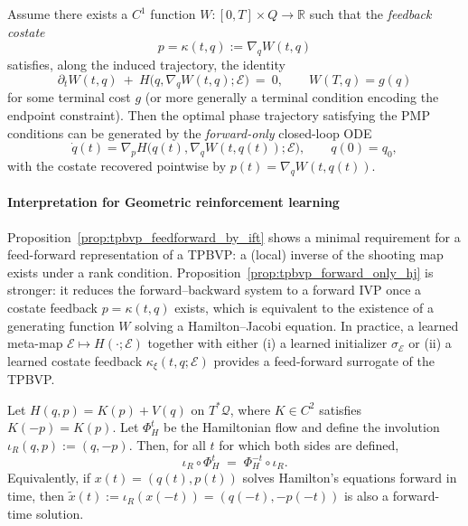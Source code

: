 \begin{proposition}
\label{prop:tpbvp_forward_only_hj}
Assume there exists a $C^1$ function $W:[0,T]\times Q\to\mathbb R$ such that the \emph{feedback costate}
\[
p=\kappa(t,q):=\nabla_q W(t,q)
\]
satisfies, along the induced trajectory, the identity
\begin{equation}
\label{eq:hj_identity}
\partial_t W(t,q)\ +\ H\big(q,\nabla_q W(t,q);\mathcal E\big)\ =\ 0,
\qquad
W(T,q)=g(q)
\end{equation}
for some terminal cost $g$ (or more generally a terminal condition encoding the endpoint constraint).
Then the optimal phase trajectory satisfying the PMP conditions can be generated by the \emph{forward-only} closed-loop ODE
\[
\dot q(t)=\nabla_p H\big(q(t),\nabla_q W(t,q(t));\mathcal E\big),\qquad q(0)=q_0,
\]
with the costate recovered pointwise by $p(t)=\nabla_q W(t,q(t))$.
\end{proposition}

\paragraph{ Interpretation for Geometric reinforcement learning}
Proposition~\ref{prop:tpbvp_feedforward_by_ift} shows a minimal requirement for a feed-forward representation of a TPBVP:
a (local) inverse of the shooting map exists under a rank condition.
Proposition~\ref{prop:tpbvp_forward_only_hj} is stronger: it reduces the forward--backward system to a forward IVP once a costate
feedback $p=\kappa(t,q)$ exists, which is equivalent to the existence of a generating function $W$ solving a Hamilton--Jacobi equation.
In practice, a learned meta-map $\mathcal E\mapsto H(\cdot;\mathcal E)$ together with either (i) a learned initializer
$\sigma_{\mathcal E}$ or (ii) a learned costate feedback $\kappa_\xi(t,q;\mathcal E)$ provides a feed-forward surrogate of the TPBVP.

\begin{lemma}
\label{lem:mech_time_reversal}
Let $H(q,p)=K(p)+V(q)$ on $T^{*}\mathcal{Q}$, where $K\in C^2$ satisfies $K(-p)=K(p)$. Let $\Phi_H^t$ be the Hamiltonian flow and define the involution $\iota_R(q,p):=(q,-p)$.
Then, for all $t$ for which both sides are defined,
\[
\iota_R\circ \Phi_H^{t} \;=\; \Phi_H^{-t}\circ \iota_R.
\]
Equivalently, if $x(t)=(q(t),p(t))$ solves Hamilton's equations forward in time, then $\tilde x(t):=\iota_R(x(-t))=(q(-t),-p(-t))$ is also a forward-time solution.
\end{lemma}

